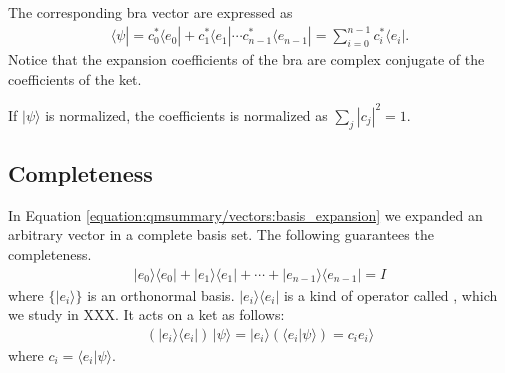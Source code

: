 \documentclass[letterpaper,10pt,english]{jupyterBook}
\begin{document}
\sphinxAtStartPar
The corresponding bra vector are expressed as
\begin{equation*}
\begin{split}
\langle \psi| = c^*_0 \langle e_0| + c^*_1 \langle e_1|  \cdots c^*_{n-1} \langle e_{n-1}| = \sum_{i=0}^{n-1} c^*_i \langle e_i|.
\end{split}
\end{equation*}
\sphinxAtStartPar
Notice that the expansion coefficients of the bra are complex conjugate of the coefficients of the ket.

\sphinxAtStartPar
If \(|\psi\rangle\) is normalized, the coefficients is normalized as \(\sum_j |c_j|^2 = 1\).


\subsection{Completeness}
\label{\detokenize{qmsummary/vectors:completeness}}
\sphinxAtStartPar
In Equation \eqref{equation:qmsummary/vectors:basis_expansion} we expanded an arbitrary vector in a complete basis set.  The following  guarantees the completeness.
\begin{equation}\label{equation:qmsummary/vectors:completeness}
\begin{split}
|e_0\rangle\langle e_0| + |e_1\rangle\langle e_1| + \cdots + |e_{n-1}\rangle\langle e_{n-1}| = I
\end{split}
\end{equation}
\sphinxAtStartPar
where \(\{|e_i\rangle\}\) is an orthonormal basis.  \(|e_i\rangle\langle e_i|\) is a kind of operator called , which we study in XXX.  It acts on a ket as follows:
\begin{equation*}
\begin{split}
(|e_i\rangle\langle e_i|)\, |\psi\rangle =  |e_i\rangle (\langle e_i|\psi\rangle) = c_i e_i\rangle
\end{split}
\end{equation*}
\sphinxAtStartPar
where \(c_i = \langle e_i|\psi\rangle\).
\end{document}
